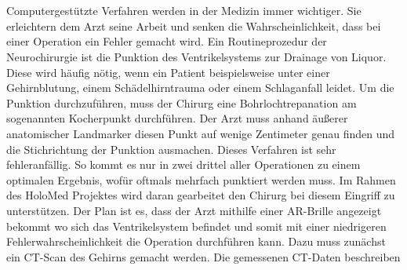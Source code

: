 \chapter{}
\label{sec:Introduction}



Computergestützte Verfahren werden in der Medizin immer wichtiger. Sie erleichtern dem Arzt seine Arbeit und senken die Wahrscheinlichkeit, dass bei einer Operation ein Fehler gemacht wird.
\newline
{}
Ein Routineprozedur der Neurochirurgie ist die Punktion des Ventrikelsystems zur Drainage von Liquor. Diese wird häufig nötig, wenn ein Patient beispielsweise unter einer Gehirnblutung, einem Schädelhirntrauma oder einem Schlaganfall leidet. Um die Punktion durchzuführen, muss der Chirurg eine Bohrlochtrepanation am sogenannten Kocherpunkt durchführen. Der Arzt muss anhand äußerer anatomischer Landmarker diesen Punkt auf wenige Zentimeter genau finden und die Stichrichtung der Punktion ausmachen. Dieses Verfahren ist sehr fehleranfällig. So kommt es nur in zwei drittel aller Operationen zu einem optimalen Ergebnis, wofür oftmals mehrfach punktiert werden muss.
\newline
Im Rahmen des HoloMed Projektes wird daran gearbeitet den Chirurg bei diesem Eingriff zu unterstützen. Der Plan ist es, dass der Arzt mithilfe einer AR-Brille angezeigt bekommt wo sich das Ventrikelsystem befindet und somit mit einer niedrigeren Fehlerwahrscheinlichkeit die Operation durchführen kann.
\newline
Dazu muss zunächst ein CT-Scan des Gehirns gemacht werden. Die gemessenen CT-Daten beschreiben 

